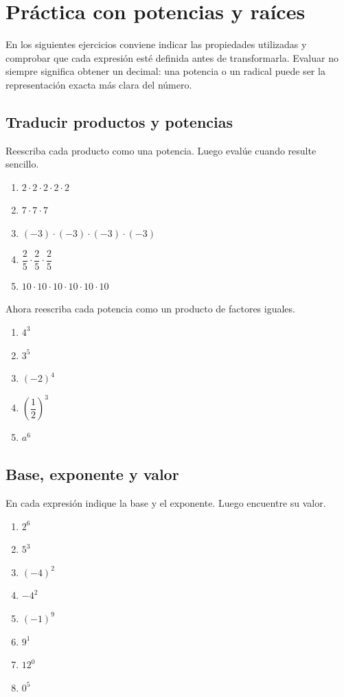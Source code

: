 \section{Práctica con potencias y raíces}

En los siguientes ejercicios conviene indicar las propiedades utilizadas y comprobar que cada expresión esté definida antes de transformarla. Evaluar no siempre significa obtener un decimal: una potencia o un radical puede ser la representación exacta más clara del número.

\subsection*{Traducir productos y potencias}

Reescriba cada producto como una potencia. Luego evalúe cuando resulte sencillo.

\begin{enumerate}
\item \(2\cdot2\cdot2\cdot2\cdot2\)
\item \(7\cdot7\cdot7\)
\item \((-3)\cdot(-3)\cdot(-3)\cdot(-3)\)
\item \(\dfrac25\cdot\dfrac25\cdot\dfrac25\)
\item \(10\cdot10\cdot10\cdot10\cdot10\cdot10\)
\end{enumerate}

Ahora reescriba cada potencia como un producto de factores iguales.

\begin{enumerate}
\item \(4^3\)
\item \(3^5\)
\item \((-2)^4\)
\item \(\left(\dfrac12\right)^3\)
\item \(a^6\)
\end{enumerate}

\subsection*{Base, exponente y valor}

En cada expresión indique la base y el exponente. Luego encuentre su valor.

\begin{enumerate}
\item \(2^6\)
\item \(5^3\)
\item \((-4)^2\)
\item \(-4^2\)
\item \((-1)^9\)
\item \(9^1\)
\item \(12^0\)
\item \(0^5\)
\end{enumerate}

